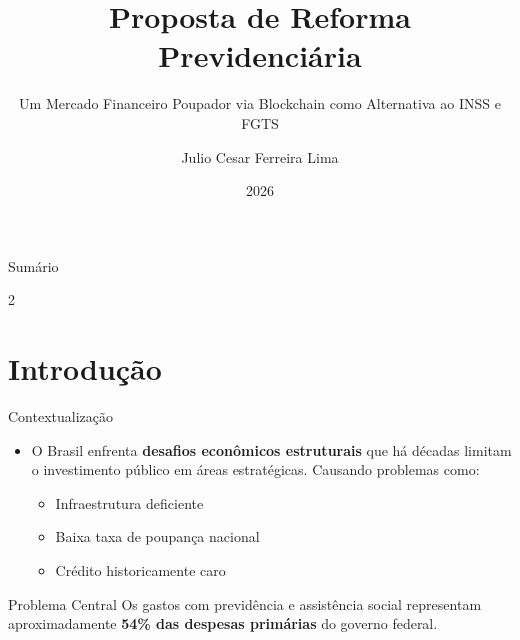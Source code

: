 \documentclass{libs/ufc_format}
\title[Reforma Previdenciária via Blockchain]{\huge\textbf{Proposta de Reforma Previdenciária}}
\subtitle{Um Mercado Financeiro Poupador via Blockchain como Alternativa ao INSS e FGTS}
\author{Julio Cesar Ferreira Lima}
\institute[UFC]{
    \normalsize{\email{julio\_flima@hotmail.com}}
    \newline
    \department{Departamento de Engenharia Elétrica}
    \newline
    \ufc
}
\date{2026}
\begin{document}


\begin{frame}{}
    \maketitle
\end{frame}

\begin{frame}{Sumário}
    \begin{multicols}{2}
        \tableofcontents
    \end{multicols}
\end{frame}

\section{Introdução}
\begin{frame}{Contextualização}
    \begin{itemize}
        \item O Brasil enfrenta \textbf{desafios econômicos estruturais} que há décadas limitam o investimento  público em áreas estratégicas. Causando problemas como:
        \vspace{0.3cm}
        \begin{itemize}
            \item Infraestrutura deficiente
            \item Baixa taxa de poupança nacional
            \item Crédito historicamente caro
        \end{itemize}
    \end{itemize}
    
    \vspace{0.3cm}
    
    \begin{alertblock}{Problema Central}
        Os gastos com previdência e assistência social representam aproximadamente \textbf{54\% das despesas primárias} do governo federal.
    \end{alertblock}
\end{frame}
\end{document}
